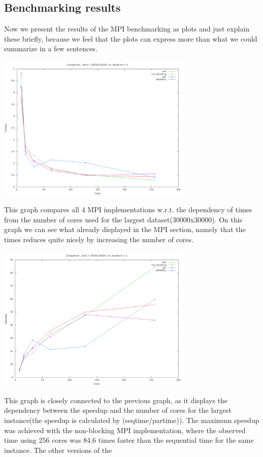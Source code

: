 \documentclass[11pt]{article}
\begin{document}
\subsection{Benchmarking results}
Now we present the results of the MPI benchmarking as plots and just explain these briefly, because we feel that the plots can express more than what we could summarize in a few sentences.

\begin{center}
\includegraphics[width=0.7\textwidth]{cmpcxt.png}
\end{center}
This graph compares all 4 MPI implementations w.r.t. the dependency of times from the number of cores used for the largest dataset(30000x30000).
On this graph we can see what already displayed in the MPI section, namely that the times reduces quite nicely by increasing the number of cores.
\begin{center}
\includegraphics[width=0.7\textwidth]{cmpsxc.png}
\end{center}
This graph is closely connected to the previous graph, as it displays the dependency between the speedup and the number of cores for the largest instance(the speedup is calculated by (seqtime/partime)).
The maximum speedup was achieved with the non-blocking MPI implementation, where the observed time using 256 cores was 84.6 times faster than the sequential time for the same instance. The other versions of the
\end{document}

